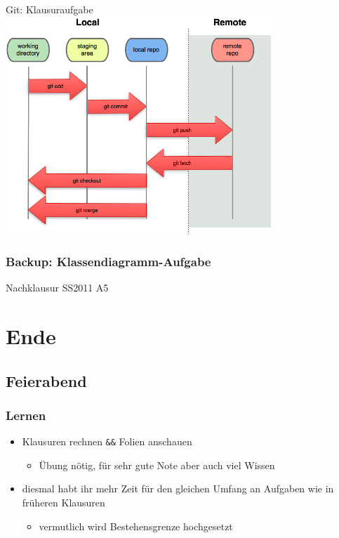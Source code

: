 \documentclass[18pt]{beamer}
\begin{document}
	\begin{frame}{Git: Klausuraufgabe}
		\centering \includegraphics[width=100mm, scale=1.3]{./pics/tut0/git-file-lifecycle.png}
	\end{frame}

	\begin{frame}
		\frametitle{Backup: Klassendiagramm-Aufgabe}
		\begin{huge}
			\centering Nachklausur SS2011 A5
		\end{huge}
	\end{frame}

\section{Ende}
	\subsection{Feierabend}
	\begin{frame}
		\frametitle{Lernen}
		\begin{itemize}
			\item Klausuren rechnen \texttt{\&\&} Folien anschauen
			\begin{itemize}
				\item Übung nötig, für sehr gute Note aber auch viel Wissen
			\end{itemize}
		\pause
			\item diesmal habt ihr mehr Zeit für den gleichen Umfang an Aufgaben wie in früheren Klausuren
			\begin{itemize}
				\item vermutlich wird Bestehensgrenze hochgesetzt
			\end{itemize}
		\end{itemize}
	\end{frame}
\end{document}
